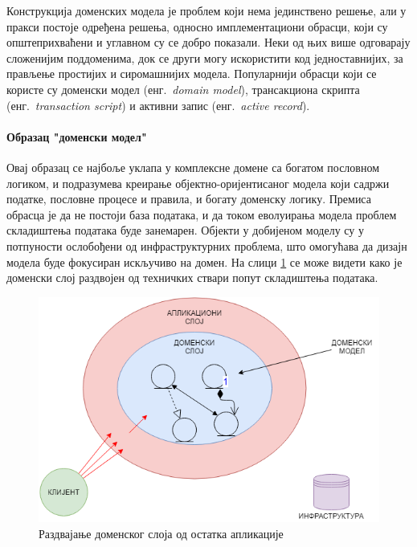 \documentclass[12pt,oneside]{memoir}
\begin{document}
Конструкција доменских модела је проблем који нема јединствено решење, али у пракси постоје одређена решења, односно имплементациони обрасци, који су општеприхваћени и углавном су се добро показали. Неки од њих више одговарају сложенијим поддоменима, док се други могу искористити код једноставнијих, за прављење простијих и сиромашнијих модела. Популарнији обрасци који се користе су доменски модел (енг.~\textit{domain model}), трансакциона скрипта (енг.~\textit{transaction script}) и активни запис (енг.~\textit{active record})\cite{peaa}.

\paragraph{Образац "доменски модел"}
Овај образац се најбоље уклапа у комплексне домене са богатом пословном логиком, и подразумева креирање објектно-оријентисаног модела који садржи податке, пословне процесе и правила, и богату доменску логику. Премиса обрасца је да не постоји база података, и да током еволуирања модела проблем складиштења података буде занемарен. Објекти у добијеном моделу су у потпуности ослобођени од инфраструктурних проблема, што омогућава да дизајн модела буде фокусиран искључиво на домен. На слици \ref{fig:razdvajanjedomenskogsloja} се може видети како је доменски слој раздвојен од техничких ствари попут складиштења података.

\begin{figure}[!ht]
  \centering
  \includegraphics[scale=0.7]{slike/razdvajanje-domenskog-sloja.png}
  \caption{Раздвајање доменског слоја од остатка апликације}
  \label{fig:razdvajanjedomenskogsloja}
\end{figure}
\end{document}

